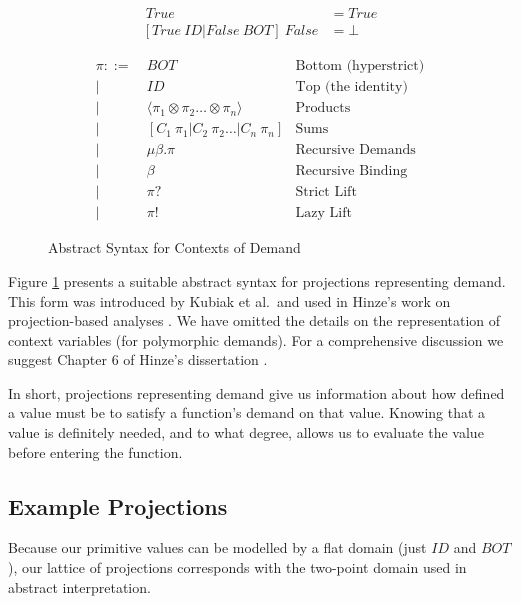 \begin{align*}
[True\ ID | False\ BOT]  \ True &= True \\
[True\ ID | False\ BOT] \ False &= \bot
\end{align*}

\begin{figure}
\begin{align*}
    \pi ::=&\ BOT              & \text{Bottom (hyperstrict)} \\
        |&\ ID               & \text{Top (the identity)} \\
        |&\ \langle \pi_{1} \otimes \pi_{2} \dots \otimes \pi_{n} \rangle   & \text{Products} \\ 
        |&\ [C_{1} \ \pi_{1} | C_{2} \ \pi_{2} \dots | C_{n} \ \pi_{n}]    & \text{Sums} \\ 
        |&\ \mu\beta . \pi     & \text{Recursive Demands} \\
        |&\ \beta              & \text{Recursive Binding} \\
        |&\ \pi?               & \text{Strict Lift} \\
        |&\ \pi!               & \text{Lazy Lift}
\end{align*}
\caption{Abstract Syntax for Contexts of Demand}
\label{fig:ContextAST}
\end{figure}


Figure \ref{fig:ContextAST}  presents a
suitable abstract syntax for projections representing demand.  This form was
introduced by Kubiak et al.\ and used in Hinze's work on projection-based
analyses \citep{kubiak, hinze1995projection}.  We have omitted the details on
the representation of context variables (for polymorphic demands). For a
comprehensive discussion we suggest Chapter 6 of Hinze's dissertation
\citep{hinze1995projection}.

In short, projections representing demand give us information about how defined
a value must be to satisfy a function's demand on that value. Knowing that a
value is definitely needed, and to what degree, allows us to evaluate the value
before entering the function.

\subsection*{Example Projections}

Because our primitive values can be modelled by a flat domain (just $ID$ and
$BOT$), our lattice of projections corresponds with the two-point domain used
in abstract interpretation.

